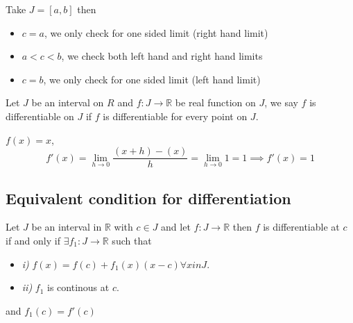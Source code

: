 \documentclass[11pt,a4paper]{colorart}
\def\R{\mathbb{R}}
\def\ra{\rightarrow}
\begin{document}
\begin{remark}
	Take $J = [a,b]$ then
	\begin{itemize}
		\item $c=a$, we only check for one sided limit (right hand limit)
		\item $a<c<b$, we check both left hand and right hand limits
		\item $c=b$, we only check for one sided limit (left hand limit)
	\end{itemize}
\end{remark}

\begin{definition}
	Let $J$ be an interval on $R$ and $f:J \ra \R$ be real function on $J$, we say $f$ is differentiable on $J$ if $f$ is differentiable for every point on $J$.
\end{definition}

\begin{example}
	$f(x) = x$, 
	\[ f'(x) = \lim_{h \to 0} \frac{ (x+h) - (x) }{ h} 
	   = \lim_{h \to 0} 1 = 1 \implies f'(x) = 1 \]
\end{example}

\subsection{Equivalent condition for differentiation}

\begin{theorem}
	Let $J$ be an interval in $\R$ with $c \in J$ and let $f:J \ra \R$ then $f$ is differentiable at $c$ if and only if $\exists f_1:J \ra \R$ such that
	\begin{itemize}
		\item \textit{i)} $f(x) = f(c) + f_1(x)  (x-c) \forall x in J$.
		\item \textit{ii)} $f_1$ is continous at $c$.
	\end{itemize}
	and $f_1(c) = f'(c)$
\end{theorem}
\end{document}
